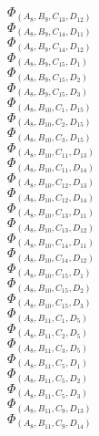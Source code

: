 \documentclass[14pt]{article}
\begin{document}
    $\Phi_{({A}_{8}, {B}_{9}, {C}_{13}, {D}_{12})}$ \\ 
    $\Phi_{({A}_{8}, {B}_{9}, {C}_{14}, {D}_{11})}$ \\ 
    $\Phi_{({A}_{8}, {B}_{9}, {C}_{14}, {D}_{12})}$ \\ 
    $\Phi_{({A}_{8}, {B}_{9}, {C}_{15}, {D}_{1})}$ \\ 
    $\Phi_{({A}_{8}, {B}_{9}, {C}_{15}, {D}_{2})}$ \\ 
    $\Phi_{({A}_{8}, {B}_{9}, {C}_{15}, {D}_{3})}$ \\ 
    $\Phi_{({A}_{8}, {B}_{10}, {C}_{1}, {D}_{15})}$ \\ 
    $\Phi_{({A}_{8}, {B}_{10}, {C}_{2}, {D}_{15})}$ \\ 
    $\Phi_{({A}_{8}, {B}_{10}, {C}_{3}, {D}_{15})}$ \\ 
    $\Phi_{({A}_{8}, {B}_{10}, {C}_{11}, {D}_{13})}$ \\ 
    $\Phi_{({A}_{8}, {B}_{10}, {C}_{11}, {D}_{14})}$ \\ 
    $\Phi_{({A}_{8}, {B}_{10}, {C}_{12}, {D}_{13})}$ \\ 
    $\Phi_{({A}_{8}, {B}_{10}, {C}_{12}, {D}_{14})}$ \\ 
    $\Phi_{({A}_{8}, {B}_{10}, {C}_{13}, {D}_{11})}$ \\ 
    $\Phi_{({A}_{8}, {B}_{10}, {C}_{13}, {D}_{12})}$ \\ 
    $\Phi_{({A}_{8}, {B}_{10}, {C}_{14}, {D}_{11})}$ \\ 
    $\Phi_{({A}_{8}, {B}_{10}, {C}_{14}, {D}_{12})}$ \\ 
    $\Phi_{({A}_{8}, {B}_{10}, {C}_{15}, {D}_{1})}$ \\ 
    $\Phi_{({A}_{8}, {B}_{10}, {C}_{15}, {D}_{2})}$ \\ 
    $\Phi_{({A}_{8}, {B}_{10}, {C}_{15}, {D}_{3})}$ \\ 
    $\Phi_{({A}_{8}, {B}_{11}, {C}_{1}, {D}_{5})}$ \\ 
    $\Phi_{({A}_{8}, {B}_{11}, {C}_{2}, {D}_{5})}$ \\ 
    $\Phi_{({A}_{8}, {B}_{11}, {C}_{3}, {D}_{5})}$ \\ 
    $\Phi_{({A}_{8}, {B}_{11}, {C}_{5}, {D}_{1})}$ \\ 
    $\Phi_{({A}_{8}, {B}_{11}, {C}_{5}, {D}_{2})}$ \\ 
    $\Phi_{({A}_{8}, {B}_{11}, {C}_{5}, {D}_{3})}$ \\ 
    $\Phi_{({A}_{8}, {B}_{11}, {C}_{9}, {D}_{13})}$ \\ 
    $\Phi_{({A}_{8}, {B}_{11}, {C}_{9}, {D}_{14})}$ \\ 
\end{document}
